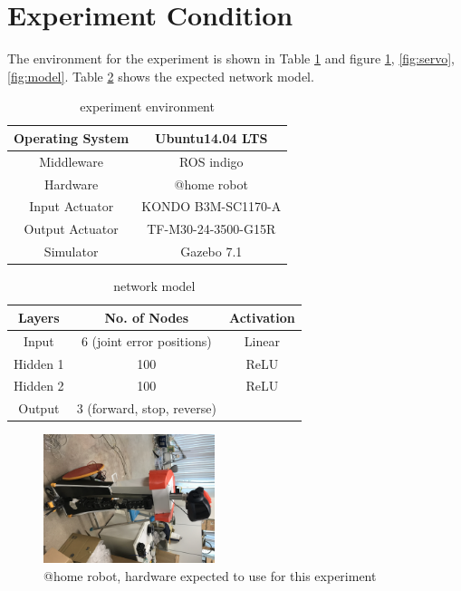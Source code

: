 \section{Experiment Condition}
The environment for the experiment is shown in Table \ref{tab:environment} and figure \ref{fig:home}, \ref{fig:servo}, \ref{fig:model}. Table \ref{tab:network} shows the expected network model.

\begin{table}[!htbp]
\begin{center}
\caption{experiment environment}
\label{tab:environment}
\begin{tabular}{|c|c|}
\hline
Operating System & Ubuntu14.04 LTS \\
\hline
Middleware & ROS indigo \\
\hline
Hardware & @home robot \\
\hline
Input Actuator & KONDO B3M-SC1170-A \\
\hline
Output Actuator & TF-M30-24-3500-G15R \\
\hline
Simulator & Gazebo 7.1 \\
\hline
\end{tabular}
\end{center}
\end{table}

\begin{table}[!htbp]
\begin{center}
\caption{network model}
\label{tab:network}
\begin{tabular}{|c|c|c|}
\hline
Layers & No. of Nodes & Activation \\
\hline
Input & 6 (joint error positions) & Linear \\
\hline
Hidden 1 & 100 & ReLU \\
\hline
Hidden 2 & 100 & ReLU \\
\hline
Output & 3 (forward, stop, reverse) &  \\
\hline
\end{tabular}
\end{center}
\end{table}

\begin{figure}[!htbp]
\begin{center}
\includegraphics[width=5cm]{athome.jpg}
\caption{@home robot, hardware expected to use for this experiment}
\label{fig:home}
\end{center}
\end{figure}

